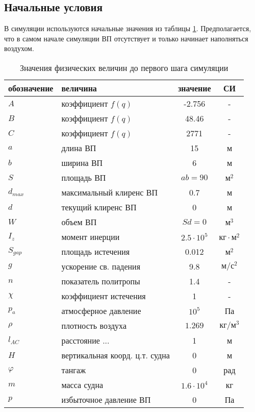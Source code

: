 \documentclass{article}%
\numberwithin{equation}{subsection}
\let\oldsubsection\subsection%
\renewcommand{\subsection}{%
  \renewcommand{\theequation}{\thesubsection.\arabic{equation}}%
  \oldsubsection}%
\begin{document}
\subsection{Начальные условия}
В симуляции используются начальные значения из таблицы \ref{tab:2}. Предполагается, что в самом начале симуляции ВП отсутствует и только начинает наполняться воздухом.

\begin{table}[h]
    \caption{Значения физических величин до первого шага симуляции}
    \centering
    \begin{tabular}{@{}llcc@{}}
        \toprule
        обозначение & величина & значение & СИ\\
        \midrule
        $A$ & коэффициент $f(q)$ & -2.756 & -\\
        \midrule
        $B$ & коэффициент $f(q)$ & 48.46 & -\\
        \midrule
        $C$ & коэффициент $f(q)$ & 2771 & -\\
        \midrule
        $a$ & длина ВП & 15 & м\\
        \midrule
        $b$ & ширина ВП & 6 & м\\
        \midrule
        $S$ & площадь ВП & $ab=90$ & $\text{м}^2$\\
        \midrule
        $d_{max}$ & максимальный клиренс ВП & 0.7 & м\\
        \midrule
        $d$ & текущий клиренс ВП & 0 & м\\
        \midrule
        $W$ & объем ВП & $Sd=0$ & $\text{м}^3$\\
        \midrule
        $I_z$ & момент инерции & $2.5\cdot 10^5$ & $\text{кг}\cdot\text{м}^2$\\
        \midrule
        $S_{gap}$ & площадь истечения & 0.012 & $\text{м}^2$\\
        \midrule
        $g$ & ускорение св. падения & 9.8 & $\text{м}/\text{с}^2$\\
        \midrule
        $n$ & показатель политропы & 1.4 & -\\
        \midrule
        $\chi$ & коэффициент истечения & 1 & -\\
        \midrule
        $p_a$ & атмосферное давление & $10^5$ & Па\\
        \midrule
        $\rho$ & плотность воздуха & $1.269$ & $\text{кг}/\text{м}^3$\\
        \midrule
        $l_{AC}$ & расстояние ... & 1 & м\\
        \midrule
        $H$ & вертикальная коорд. ц.т. судна & 0 & м\\
        \midrule
        $\varphi$ & тангаж & 0 & рад \\
        \midrule
        $m$ & масса судна & $1.6\cdot 10^4$ & кг\\
        \midrule
        $p$ & избыточное давление ВП & 0 & Па\\
        \bottomrule
    \end{tabular}
    \label{tab:2}
\end{table}
\end{document}
